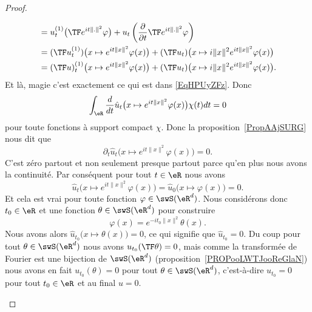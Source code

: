 \begin{proof}
\begin{subproof}
\begin{subequations}
\begin{align}
				                                                              & =u_t^{(1)}\big( \TF  e^{it\| . \|^2}\varphi \big)+u_t\left( \frac{ \partial  }{ \partial t }\TF e^{it\| . \|^2}\varphi \right)      \\
				                                                              & =(\TF u_t^{(1)})\big( x\mapsto  e^{it\| x \|^2}\varphi(x) \big)+(\TF u_t)\big( x\mapsto i\| x \|^2 e^{it\| x \|^2}\varphi(x) \big)  \\
				                                                              & =(\TF u)_t^{(1)}\big( x\mapsto  e^{it\| x \|^2}\varphi(x) \big)+(\TF u_t)\big( x\mapsto i\| x \|^2 e^{it\| x \|^2}\varphi(x) \big).
			\end{align}
		\end{subequations}
		Et là, magie c'est exactement ce qui est dans \eqref{EqHPUyZFz}. Donc
		\begin{equation}
			\int_{\eR}\frac{ d }{ dt }\hat u_t\big( x\mapsto  e^{it\| x \|^2}\varphi(x) \big)\chi(t)dt=0
		\end{equation}
		pour toute fonctions à support compact \( \chi\). Donc la proposition~\ref{PropAAjSURG} nous dit que
		\begin{equation}
			\partial_t\hat u_t\big( x\mapsto e^{it\| x \|^2}\varphi(x) \big)=0.
		\end{equation}
		C'est zéro partout et non seulement presque partout parce qu'en plus nous avons la continuité. Par conséquent pour tout \( t\in \eR\) nous avons
		\begin{equation}
			\hat u_t\big( x\mapsto e^{it\| x \|^2}\varphi(x) \big)=\hat u_0\big( x\mapsto \varphi(x)\big)=0.
		\end{equation}
		Et cela est vrai pour toute fonction \( \varphi\in\swS(\eR^d)\). Nous considérons donc \( t_0\in \eR\) et une fonction \( \theta\in\swS(\eR^d)\) pour construire
		\begin{equation}
			\varphi(x)= e^{-it_0\| x \|^2}\theta(x).
		\end{equation}
		Nous avons alors \( \hat u_{t_0}\big( x\mapsto\theta(x) \big)=0\), ce qui signifie que \( \hat u_{t_0}=0\). Du coup pour tout \( \theta\in\swS(\eR^d)\) nous avons \( u_{t_0}(\TF\theta)=0\), mais comme la transformée de Fourier est une bijection de \( \swS(\eR^d)\) (proposition~\ref{PROPooLWTJooReGlaN}) nous avons en fait \( u_{t_0}(\theta)=0\) pour tout \( \theta\in\swS(\eR^d)\), c'est-à-dire \( u_{t_0}=0\) pour tout \( t_0\in \eR\) et au final \( u=0\).
	\end{subproof}
\end{proof}
